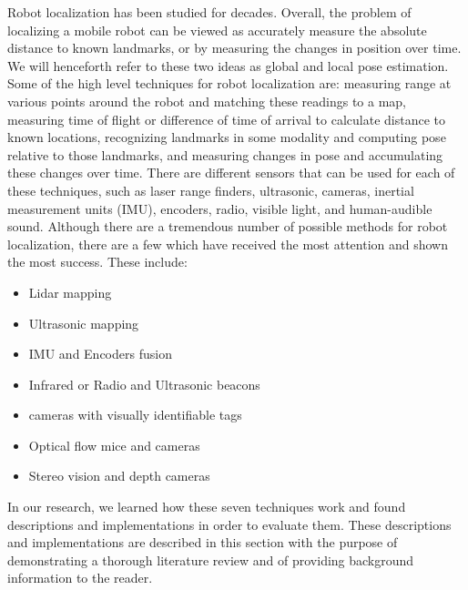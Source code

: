 \documentclass{article}
\begin{document}
Robot localization has been studied for decades. Overall, the problem of localizing a mobile robot can be viewed as accurately measure the absolute distance to known landmarks, or by measuring the changes in position over time. We will henceforth refer to these two ideas as global and local pose estimation. Some of the high level techniques for robot localization are: measuring range at various points around the robot and matching these readings to a map, measuring time of flight or difference of time of arrival to calculate distance to known locations, recognizing landmarks in some modality and computing pose relative to those landmarks, and measuring changes in pose and accumulating these changes over time. There are different sensors that can be used for each of these techniques, such as laser range finders, ultrasonic, cameras, inertial measurement units (IMU), encoders, radio, visible light, and human-audible sound. Although there are a tremendous number of possible methods for robot localization, there are a few which have received the most attention and shown the most success. These include:
\begin{itemize}
    \item Lidar mapping
    \item Ultrasonic mapping
    \item IMU and Encoders fusion
    \item Infrared or Radio and Ultrasonic beacons
    \item cameras with visually identifiable tags
    \item Optical flow mice and cameras
    \item Stereo vision and depth cameras
\end{itemize}

In our research, we learned how these seven techniques work and found descriptions and implementations in order to evaluate them. These descriptions and implementations are described in this section with the purpose of demonstrating a thorough literature review and of providing background information to the reader.
\end{document}
